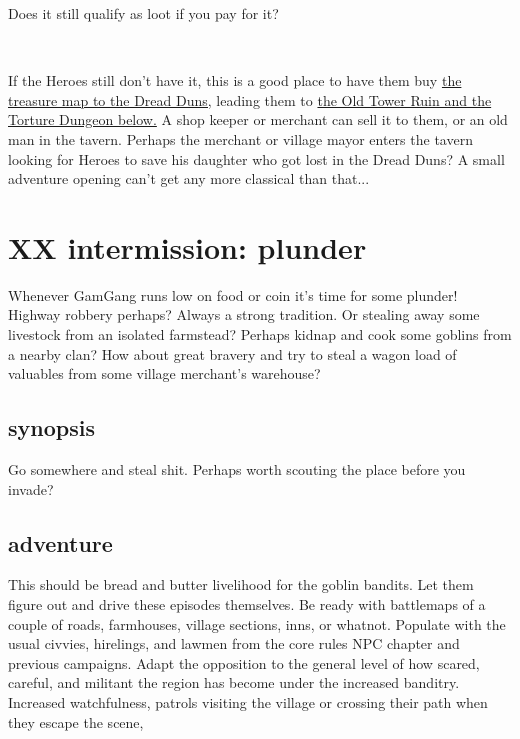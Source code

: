 Does it still qualify as loot if you pay for it?

\

\noindent If the Heroes still don't have it, this is a good place to have them buy 
\hyperref[appendixtreasuremap]{the treasure map to the Dread Duns,} 
leading them to 
\hyperref[xxtorturedungeon]{the Old Tower Ruin and the Torture Dungeon below.} 
A shop keeper or merchant can sell it to them, or an old man in the tavern.  Perhaps the merchant or village mayor enters the tavern looking for Heroes to save his daughter who got lost in the Dread Duns? A small adventure opening can't get any more classical than that...













\clearpage
\section*{XX intermission: plunder}

Whenever GamGang runs low on food or coin it's time for some plunder! Highway robbery perhaps? Always a strong tradition. Or stealing away some livestock from an isolated farmstead? Perhaps kidnap and cook some goblins from a nearby clan? How about great bravery and try to steal a wagon load of valuables from some village merchant's warehouse?


\subsection*{synopsis}

Go somewhere and steal shit. Perhaps worth scouting the place before you invade?


\subsection*{adventure}

This should be bread and butter livelihood for the goblin bandits. Let them figure out and drive these episodes themselves. Be ready with battlemaps of a couple of roads, farmhouses, village sections, inns, or whatnot. Populate with the usual civvies, hirelings, and lawmen from the core rules NPC chapter and previous campaigns.
Adapt the opposition to the general level of how scared, careful, and militant the region has become under the increased banditry. Increased watchfulness, patrols visiting the village or crossing their path when they escape the scene, 



